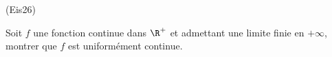 \begin{tiny}(Eis26)\end{tiny} Soit $f$ une fonction continue dans $\R^{+}$ et admettant une limite finie en $+\infty $, montrer que $f$ est uniform{\'e}ment continue.